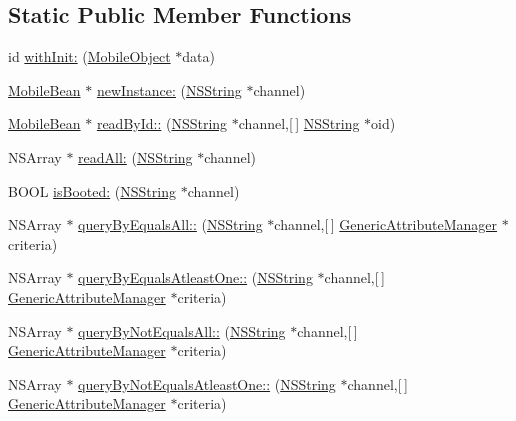 \subsection*{\-Static \-Public \-Member \-Functions}
\begin{DoxyCompactItemize}
\item 
id \hyperlink{interface_mobile_bean_a603748158f929bb1d2ba503996bf19c6}{with\-Init\-:} (\hyperlink{interface_mobile_object}{\-Mobile\-Object} $\ast$data)
\item 
\hyperlink{interface_mobile_bean}{\-Mobile\-Bean} $\ast$ \hyperlink{interface_mobile_bean_a057a773dfb42af5bba5b4d66906c02d6}{new\-Instance\-:} (\hyperlink{class_n_s_string}{\-N\-S\-String} $\ast$channel)
\item 
\hyperlink{interface_mobile_bean}{\-Mobile\-Bean} $\ast$ \hyperlink{interface_mobile_bean_add178c1be67319073729cbde05fdd7d6}{read\-By\-Id\-::} (\hyperlink{class_n_s_string}{\-N\-S\-String} $\ast$channel,\mbox{[}$\,$\mbox{]} \hyperlink{class_n_s_string}{\-N\-S\-String} $\ast$oid)
\item 
\-N\-S\-Array $\ast$ \hyperlink{interface_mobile_bean_a124a6d20066ae3827f392f6be18ef68e}{read\-All\-:} (\hyperlink{class_n_s_string}{\-N\-S\-String} $\ast$channel)
\item 
\-B\-O\-O\-L \hyperlink{interface_mobile_bean_a2497377110c750f933d89cfdc05ac34e}{is\-Booted\-:} (\hyperlink{class_n_s_string}{\-N\-S\-String} $\ast$channel)
\item 
\-N\-S\-Array $\ast$ \hyperlink{interface_mobile_bean_a41627ec92b2469c6d90d8770b4a7143f}{query\-By\-Equals\-All\-::} (\hyperlink{class_n_s_string}{\-N\-S\-String} $\ast$channel,\mbox{[}$\,$\mbox{]} \hyperlink{interface_generic_attribute_manager}{\-Generic\-Attribute\-Manager} $\ast$criteria)
\item 
\-N\-S\-Array $\ast$ \hyperlink{interface_mobile_bean_a6d08a46f238b32c0371bbf61726e35d0}{query\-By\-Equals\-Atleast\-One\-::} (\hyperlink{class_n_s_string}{\-N\-S\-String} $\ast$channel,\mbox{[}$\,$\mbox{]} \hyperlink{interface_generic_attribute_manager}{\-Generic\-Attribute\-Manager} $\ast$criteria)
\item 
\-N\-S\-Array $\ast$ \hyperlink{interface_mobile_bean_aa5161717f1beb0e558b99757431b8d55}{query\-By\-Not\-Equals\-All\-::} (\hyperlink{class_n_s_string}{\-N\-S\-String} $\ast$channel,\mbox{[}$\,$\mbox{]} \hyperlink{interface_generic_attribute_manager}{\-Generic\-Attribute\-Manager} $\ast$criteria)
\item 
\-N\-S\-Array $\ast$ \hyperlink{interface_mobile_bean_ac9e76ed3e5b926cbcdfb278c3137d7a9}{query\-By\-Not\-Equals\-Atleast\-One\-::} (\hyperlink{class_n_s_string}{\-N\-S\-String} $\ast$channel,\mbox{[}$\,$\mbox{]} \hyperlink{interface_generic_attribute_manager}{\-Generic\-Attribute\-Manager} $\ast$criteria)

\end{DoxyCompactItemize}
